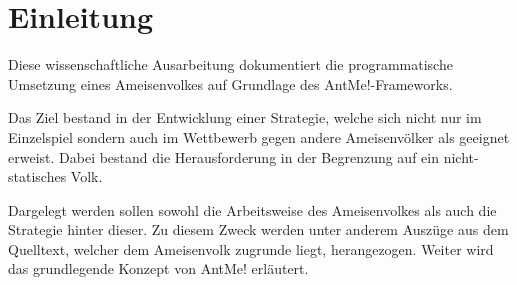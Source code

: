 \section{Einleitung}

Diese wissenschaftliche Ausarbeitung dokumentiert die programmatische Umsetzung eines Ameisenvolkes auf Grundlage des AntMe!-Frameworks.

Das Ziel bestand in der Entwicklung einer Strategie, welche sich nicht nur im Einzelspiel sondern auch im Wettbewerb gegen andere Ameisenvölker als geeignet erweist. Dabei bestand die Herausforderung in der Begrenzung auf ein nicht-statisches Volk.

Dargelegt werden sollen sowohl die Arbeitsweise des Ameisenvolkes als auch die Strategie hinter dieser. Zu diesem Zweck werden unter anderem Auszüge aus dem Quelltext, welcher dem Ameisenvolk zugrunde liegt, herangezogen. Weiter wird das grundlegende Konzept von AntMe! erläutert.